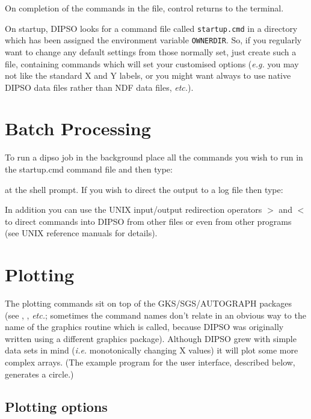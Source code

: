 \documentclass[twoside,11pt,noabs,nolof]{starlink}
\begin{document}
On completion of the commands in the file, control returns to the terminal.

On startup, DIPSO looks for a command file called {\texttt{startup.cmd}}
in a directory which has been
assigned the environment variable {\texttt{OWNERDIR}}.  So, if
you regularly want to change any default settings from those normally
set, just create such a file, containing commands which will set your
customised options (\emph{e.g.} you may not like the standard X and Y
labels, or you might want always to use native DIPSO data files rather
than NDF data files, \emph{etc.}).

\section {Batch Processing}

To run a dipso job in the background place all the commands you wish
to run in the startup.cmd command file and then type:

\begin{terminalv}
\end{terminalv}

at the shell prompt. If you wish to direct the output to a log file
then type:

\begin{terminalv}
\end{terminalv}

In addition you can use the UNIX input/output redirection operators
\(>\) and \(<\) to direct commands into DIPSO from other files or even
from other programs (see UNIX reference manuals for details).

\section {Plotting}

The plotting commands sit on top of the GKS/SGS/AUTOGRAPH packages (see
, , \emph{etc.}; sometimes the
command names don't relate in an obvious way to the name of the graphics
routine which is called, because DIPSO was originally written using a
different graphics package). Although DIPSO grew with simple data sets in
mind (\emph{i.e.} monotonically changing X values) it will plot some more
complex arrays. (The example program for the user interface, described
below, generates a circle.)

\subsection {Plotting options}
\end{document}
